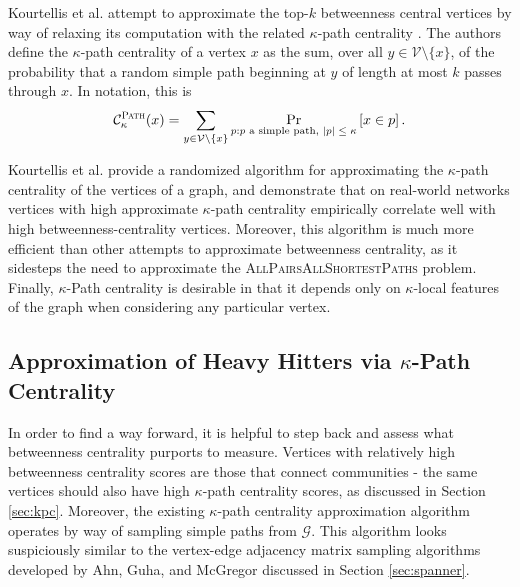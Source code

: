 \documentclass{report}
\newcommand{\algoname}[1]{\textnormal{\textsc{#1}}}
\begin{document}
Kourtellis et al. attempt to approximate the top-$k$ betweenness central vertices by way of relaxing its computation with the related $\kappa$-path centrality \cite{alahakoon2011k, kourtellis2013identifying}.
The authors define the $\kappa$-path centrality of a vertex $x$ as the sum, over all $y \in \mathcal{V} \setminus \{x\}$, of the probability that a random simple path beginning at $y$ of length at most $k$ passes through $x$. 
In notation, this is 
%
\begin{equation} \label{eq:kpath}
	\mathcal{C}^{\algoname{Path}}_\kappa(x) = \sum\limits_{y \in \mathcal{V} \setminus \{x\}} 
		\Pr_{p: \textnormal{$p$ a simple path, $|p| \leq \kappa$}}
 		\left [ x \in p \right ].
\end{equation}
%


Kourtellis et al. provide a randomized algorithm for approximating the $\kappa$-path centrality of the vertices of a graph, and demonstrate that on real-world networks vertices with high approximate $\kappa$-path centrality empirically correlate well with high betweenness-centrality vertices. 
Moreover, this algorithm is much more efficient than other attempts to approximate betweenness centrality, as it sidesteps the need to approximate the \algoname{AllPairsAllShortestPaths} problem.
Finally, $\kappa$-Path centrality is desirable in that it depends only on $\kappa$-local features of the graph when considering any particular vertex.




\subsection{Approximation of Heavy Hitters via $\kappa$-Path Centrality} 
\label{sec:kpc:hh}

In order to find a way forward, it is helpful to step back and assess what betweenness centrality purports to measure.
Vertices with relatively high betweenness centrality scores are those that connect communities - the same vertices should also have high $\kappa$-path centrality scores, as discussed in Section \ref{sec:kpc}. 
Moreover, the existing $\kappa$-path centrality approximation algorithm operates by way of sampling simple paths from $\mathcal{G}$.
This algorithm looks suspiciously similar to the vertex-edge adjacency matrix sampling algorithms developed by Ahn, Guha, and McGregor discussed in Section \ref{sec:spanner}. 
\end{document}
